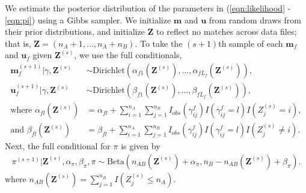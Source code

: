 \documentclass[ba]{imsart}
\begin{document}

We estimate the posterior distribution of the parameters in (\ref{eqn:likelihood} - \ref{eqn:pi}) using a Gibbs sampler. We initialize $\bm{m}$ and $\bm{u}$ from random draws from their prior distributions, and initialize $\bm{Z}$ to reflect no matches across data files; that is, $\bm{Z} = (n_A + 1, \ldots, n_A + n_B)$. To take the $(s+1)$th sample of each $\bm{m}_f$ and $\bm{u}_f$ given $\bm{Z}^{(s)}$, we use the full conditionals,
\begin{subequations}
\begin{align}
	\bm{m}_f^{(s+1)}|\gamma, \bm{Z}^{(s)} &\sim \text{Dirichlet}(\alpha_{f1}(\bm{Z}^{(s)}), \ldots, \alpha_{fL_f}(\bm{Z}^{(s)})), \label{eqn:m_update} \\
	\bm{u}_f^{(s+1)}|\gamma, \bm{Z}^{(s)} &\sim \text{Dirichlet}(\beta_{f1}(\bm{Z}^{(s)}), \ldots, \beta_{fL_f}(\bm{Z}^{(s)})), \label{eqn:u_update} \\
	\text{where }\alpha_{fl}(\bm{Z}^{(s)})&= \alpha_{fl} + \sum_{i=1}^{n_A}\sum_{j=1}^{n_B} I_{obs}(\gamma_{ij}^f) I(\gamma_{ij}^f = l) I(Z_j^{(s)} = i), \label{eqn:alpha_update} \\
	\text{and } \beta_{fl}(\bm{Z}^{(s)})&=  \beta_{fl} + \sum_{i=1}^{n_A}\sum_{j=1}^{n_B}  I_{obs}(\gamma_{ij}^f) I(\gamma_{ij}^f = l) I(Z_j^{(s)} \neq i) \label{eqn:beta_update}.
\end{align}
\end{subequations}
Next, the full conditional for $\pi$ is given by
\begin{align}
	\pi^{(s+1)}|\bm{Z}^{(s)},  \alpha_{\pi}, \beta_{\pi}, \pi \sim  \text{Beta}(n_{AB}(\bm{Z}^{(s)}) + \alpha_{\pi}, n_B - n_{AB}(\bm{Z}^{(s)}) + \beta_{\pi}).
\end{align}
where $n_{AB}(\bm{Z}^{(s)}) = \sum_{j=1}^{n_B} I(Z_j^{(s)} \leq n_A)$.
\end{document}
